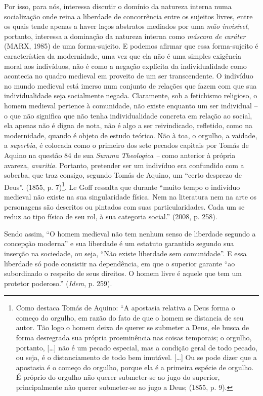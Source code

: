 Por isso, para nós, interessa discutir o domínio da natureza interna
numa socialização onde reina a liberdade de concorrência entre os
sujeitos livres, entre os quais tende apenas a haver laços abstratos
mediados por uma \emph{mão invisível}, portanto, interessa a dominação
da natureza interna como \emph{máscara de caráter} (MARX, 1985) de uma
forma-sujeito. E podemos afirmar que essa forma-sujeito é característica
da modernidade, uma vez que ela não é uma simples exigência moral aos
indivíduos, não é como a negação explícita da individualidade como
acontecia no quadro medieval em proveito de um ser transcendente. O
indivíduo no mundo medieval está imerso num conjunto de relações que
fazem com que sua individualidade seja socialmente negada. Claramente,
sob a fetichismo religioso, o homem medieval pertence à comunidade, não
existe enquanto um ser individual -- o que não significa que não tenha
individualidade concreta em relação ao social, ela apenas não é digna de
nota, não é algo a ser reivindicado, refletido, como na modernidade,
quando é objeto de estudo teórico. Não à toa, o orgulho, a vaidade, a
\emph{superbia}, é colocada como o primeiro dos sete pecados capitais
por Tomás de Aquino na questão 84 de sua \emph{Summa} \emph{Theologica
--} como anterior à própria avareza, \emph{avaritia}. Portanto,
pretender ser um indivíduo era confundido com a soberba, que traz
consigo, segundo Tomás de Aquino, um ``certo desprezo de Deus''. (1855,
p. 7)\footnote{Como destaca Tomás de Aquino: ``A apostasia relativa a
  Deus forma o começo do orgulho, em razão do fato de que o homem se
  distancia de seu autor. Tão logo o homem deixa de querer se submeter a
  Deus, ele busca de forma desregrada sua própria proeminência nas
  coisas temporais; o orgulho, portanto, {[}\ldots{}{]} não é um pecado
  especial, mas a condição geral de todo pecado, ou seja, é o
  distanciamento de todo bem imutável. {[}\ldots{}{]} Ou se pode dizer
  que a apostasia é o começo do orgulho, porque ela é a primeira espécie
  de orgulho. É próprio do orgulho não querer submeter-se ao jugo do
  superior, principalmente não querer submeter-se ao jugo a Deus; (1855,
  p. 9).}. Le Goff ressalta que durante ``muito tempo o indivíduo
medieval não existe na sua singularidade física. Nem na literatura nem
na arte os personagens são descritos ou pintados com suas
particularidades. Cada um se reduz ao tipo físico de seu rol, à sua
categoria social.'' (2008, p. 258).

Sendo assim, ``O homem medieval não tem nenhum senso de liberdade
segundo a concepção moderna'' e sua liberdade é um estatuto garantido
segundo sua inserção na sociedade, ou seja, ``Não existe liberdade sem
comunidade''. E essa liberdade só pode consistir na dependência, em que
o superior garante ``ao subordinado o respeito de seus direitos. O homem
livre é aquele que tem um protetor poderoso.'' (\emph{Idem}, p. 259).

